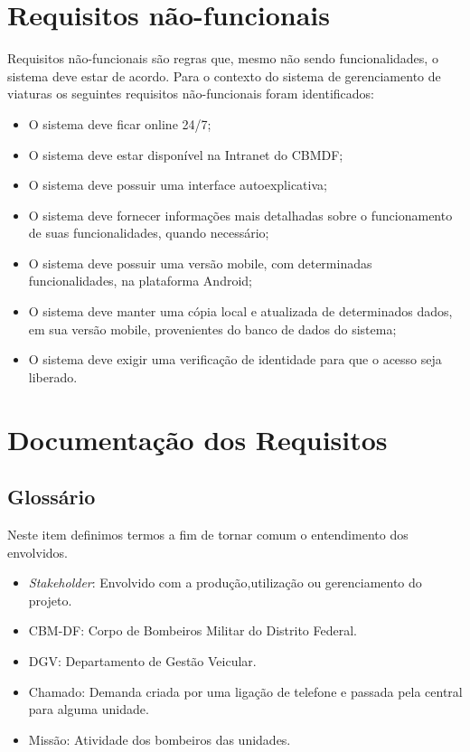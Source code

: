 	\section{Requisitos não-funcionais}		
Requisitos não-funcionais são regras que, mesmo não sendo funcionalidades, o sistema deve estar de acordo. Para o contexto do 
sistema de gerenciamento de viaturas os seguintes requisitos não-funcionais foram identificados:
\begin{itemize}
 \item O sistema deve ficar online 24/7;
 \item O sistema deve estar disponível na Intranet do CBMDF;
 \item O sistema deve possuir uma interface autoexplicativa;
 \item O sistema deve fornecer informações mais detalhadas sobre o funcionamento de suas funcionalidades, quando necessário;
 \item O sistema deve possuir uma versão mobile, com determinadas funcionalidades, na plataforma Android;
 \item O sistema deve manter uma cópia local e atualizada de determinados dados, em sua versão mobile, provenientes do banco de dados do sistema;
 \item O sistema deve exigir uma verificação de identidade para que o acesso seja liberado.
\end{itemize}
	\section{Documentação dos Requisitos}
		\subsection{Glossário}
Neste item definimos termos a fim de tornar comum o entendimento dos envolvidos.
\begin{itemize}
 \item \textit{Stakeholder}: Envolvido com a produção,utilização ou gerenciamento do projeto.
 \item CBM-DF: Corpo de Bombeiros Militar do Distrito Federal.
 \item DGV: Departamento de Gestão Veicular.
 \item Chamado: Demanda criada por uma ligação de telefone e passada pela central para alguma unidade.
 \item Missão: Atividade dos bombeiros das unidades.
\end{itemize}